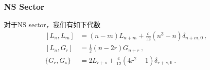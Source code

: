 \subsubsection{NS Sector}
对于NS sector，我们有如下代数
\begin{equation}
\begin{aligned}
[ L_n,L_m ] &= (n-m) L_{n+m} + \frac{c}{12} (n^3-n) \delta_{n+m,0}~,\\
[L_n,G_r] &= \frac{1}{2} (n-2r) G_{n+r}~, \\
\{ G_r, G_s \} &= 2 L_{r+s} + \frac{c}{12} (4 r^2 - 1) \delta_{r+s,0}~.
\end{aligned}
\end{equation}


























































